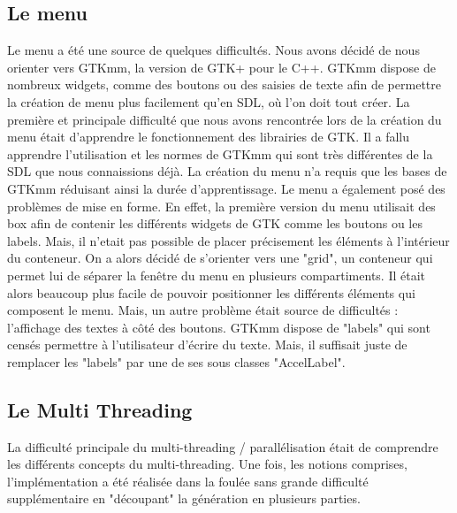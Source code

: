 \documentclass{article}
\begin{document}
\subsection*{Le menu}
Le menu a été une source de quelques difficultés. Nous avons décidé de nous orienter vers GTKmm, la version de GTK+ pour le C++. GTKmm dispose de nombreux widgets, comme des boutons ou des saisies de texte afin de permettre la création de menu plus facilement qu'en SDL, où l'on doit tout créer. La première et principale difficulté que nous avons rencontrée lors de la création du menu était d'apprendre le fonctionnement des librairies de GTK. Il a fallu apprendre l'utilisation et les normes de GTKmm qui sont très différentes de la SDL que nous connaissions déjà. La création du menu n'a requis que les bases de GTKmm réduisant ainsi la durée d'apprentissage. Le menu a également posé des problèmes de mise en forme. En effet, la première version du menu utilisait des box afin de contenir les différents widgets de GTK comme les boutons ou les labels. Mais, il n'etait pas possible de placer précisement les éléments à l'intérieur du conteneur. On a alors décidé de s'orienter vers une "grid", un conteneur qui permet lui de séparer la fenêtre du menu en plusieurs compartiments. Il était alors beaucoup plus facile de pouvoir positionner les différents éléments qui composent le menu. Mais, un autre problème était source de difficultés : l'affichage des textes à côté des boutons. GTKmm dispose de "labels" qui sont censés permettre à l'utilisateur d'écrire du texte. Mais, il suffisait juste de remplacer les "labels" par une de ses sous classes "AccelLabel".

\subsection*{Le Multi Threading}
La difficulté principale du multi-threading / parallélisation était de comprendre les différents concepts du multi-threading. Une fois, les notions comprises, l'implémentation a été réalisée dans la foulée sans grande difficulté supplémentaire en "découpant" la génération en plusieurs parties. 
\end{document}
